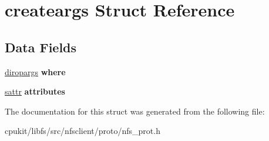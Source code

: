 \hypertarget{structcreateargs}{}\section{createargs Struct Reference}
\label{structcreateargs}
\subsection*{Data Fields}
\begin{DoxyCompactItemize}
\item 
\mbox{\label{structcreateargs_a8a8bfdd093cd26488eda59a73783b121}} 
\mbox{\hyperlink{structdiropargs}{diropargs}} {\bfseries where}
\item 
\mbox{\label{structcreateargs_ae7389fea5df9ebde9fee10cc340f5be2}} 
\mbox{\hyperlink{structsattr}{sattr}} {\bfseries attributes}
\end{DoxyCompactItemize}


The documentation for this struct was generated from the following file\+:\begin{DoxyCompactItemize}
\item 
cpukit/libfs/src/nfsclient/proto/nfs\+\_\+prot.\+h\end{DoxyCompactItemize}
